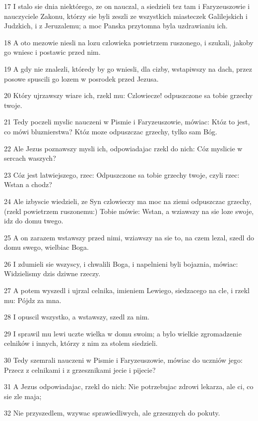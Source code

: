 \par 17 I stalo sie dnia niektórego, ze on nauczal, a siedzieli tez tam i Faryzeuszowie i nauczyciele Zakonu, którzy sie byli zeszli ze wszystkich miasteczek Galilejskich i Judzkich, i z Jeruzalemu; a moc Panska przytomna byla uzdrawianiu ich.
\par 18 A oto mezowie niesli na lozu czlowieka powietrzem ruszonego, i szukali, jakoby go wniesc i postawic przed nim.
\par 19 A gdy nie znalezli, któredy by go wniesli, dla cizby, wstapiwszy na dach, przez posowe spuscili go lozem w posrodek przed Jezusa.
\par 20 Który ujrzawszy wiare ich, rzekl mu: Czlowiecze! odpuszczone sa tobie grzechy twoje.
\par 21 Tedy poczeli myslic nauczeni w Pismie i Faryzeuszowie, mówiac: Któz to jest, co mówi bluznierstwa? Któz moze odpuszczac grzechy, tylko sam Bóg.
\par 22 Ale Jezus poznawszy mysli ich, odpowiadajac rzekl do nich: Cóz myslicie w sercach waszych?
\par 23 Cóz jest latwiejszego, rzec: Odpuszczone sa tobie grzechy twoje, czyli rzec: Wstan a chodz?
\par 24 Ale izbyscie wiedzieli, ze Syn czlowieczy ma moc na ziemi odpuszczac grzechy, (rzekl powietrzem ruszonemu:) Tobie mówie: Wstan, a wziawszy na sie loze swoje, idz do domu twego.
\par 25 A on zarazem wstawszy przed nimi, wziawszy na sie to, na czem lezal, szedl do domu swego, wielbiac Boga.
\par 26 I zdumieli sie wszyscy, i chwalili Boga, i napelnieni byli bojaznia, mówiac: Widzielismy dzis dziwne rzeczy.
\par 27 A potem wyszedl i ujrzal celnika, imieniem Lewiego, siedzacego na cle, i rzekl mu: Pójdz za mna.
\par 28 I opuscil wszystko, a wstawszy, szedl za nim.
\par 29 I sprawil mu lewi uczte wielka w domu swoim; a bylo wielkie zgromadzenie celników i innych, którzy z nim za stolem siedzieli.
\par 30 Tedy szemrali nauczeni w Pismie i Faryzeuszowie, mówiac do uczniów jego: Przecz z celnikami i z grzesznikami jecie i pijecie?
\par 31 A Jezus odpowiadajac, rzekl do nich: Nie potrzebujac zdrowi lekarza, ale ci, co sie zle maja;
\par 32 Nie przyszedlem, wzywac sprawiedliwych, ale grzesznych do pokuty.
